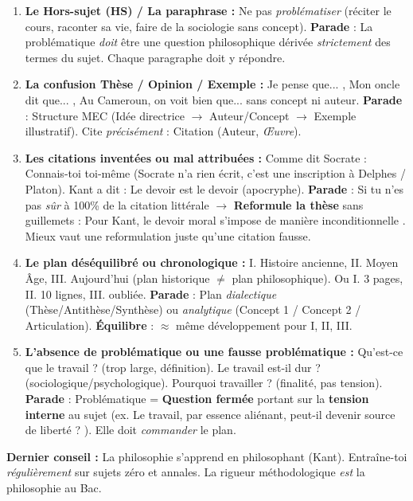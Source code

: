 \documentclass[11pt]{article}
\newcommand{\cle}[1]{{\popxbold\color{popdark}#1}}
\begin{document}
\begin{attention}
    \begin{enumerate}
        \item \textbf{Le Hors-sujet (HS) / La paraphrase :} Ne pas \emph{problématiser} (réciter le cours, raconter sa vie, faire de la sociologie sans concept). \textbf{Parade} : La problématique \emph{doit} être une question philosophique dérivée \emph{strictement} des termes du sujet. Chaque paragraphe doit y répondre.
        \item \textbf{La confusion \cle{Thèse} / \cle{Opinion} / \cle{Exemple} :} \guillemotleft Je pense que... \guillemotright, \guillemotleft Mon oncle dit que... \guillemotright, \guillemotleft Au Cameroun, on voit bien que... \guillemotright sans concept ni auteur. \textbf{Parade} : Structure MEC (Idée directrice $\rightarrow$ Auteur/Concept $\rightarrow$ Exemple illustratif). Cite \emph{précisément} : \guillemotleft Citation \guillemotright (Auteur, \emph{Œuvre}).
        \item \textbf{Les citations \textbf{inventées} ou \textbf{mal attribuées} :} \guillemotleft Comme dit Socrate : \guillemotleft Connais-toi toi-même \guillemotright \guillemotright (Socrate n'a rien écrit, c'est une inscription à Delphes / Platon). \guillemotleft Kant a dit : \guillemotleft Le devoir est le devoir \guillemotright \guillemotright (apocryphe). \textbf{Parade} : Si tu n'es pas \emph{sûr} à 100\% de la citation littérale $\rightarrow$ \textbf{Reformule la thèse} sans guillemets : \guillemotleft Pour Kant, le devoir moral s'impose de manière inconditionnelle \guillemotright. Mieux vaut une reformulation juste qu'une citation fausse.
        \item \textbf{Le plan \textbf{déséquilibré} ou \textbf{chronologique} :} I. Histoire ancienne, II. Moyen Âge, III. Aujourd'hui (plan historique $\neq$ plan philosophique). Ou I. 3 pages, II. 10 lignes, III. oubliée. \textbf{Parade} : Plan \emph{dialectique} (Thèse/Antithèse/Synthèse) ou \emph{analytique} (Concept 1 / Concept 2 / Articulation). \textbf{Équilibre} : $\approx$ même développement pour I, II, III.
        \item \textbf{L'absence de \textbf{problématique} ou une \textbf{fausse problématique} :} \guillemotleft Qu'est-ce que le travail ? \guillemotright (trop large, définition). \guillemotleft Le travail est-il dur ? \guillemotright (sociologique/psychologique). \guillemotleft Pourquoi travailler ? \guillemotright (finalité, pas tension). \textbf{Parade} : Problématique = \textbf{Question fermée} portant sur la \textbf{tension interne} au sujet (ex. \guillemotleft Le travail, par essence aliénant, peut-il devenir source de liberté ? \guillemotright). Elle doit \emph{commander} le plan.
    \end{enumerate}
    \textbf{Dernier conseil :} \guillemotleft La philosophie s'apprend en philosophant \guillemotright (Kant). Entraîne-toi \emph{régulièrement} sur sujets zéro et annales. La rigueur méthodologique \emph{est} la philosophie au Bac.
\end{attention}
\end{document}
